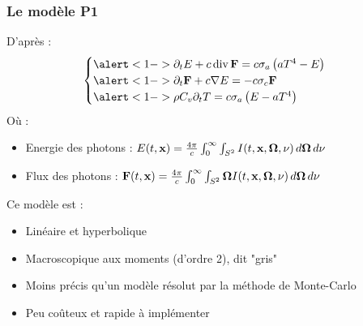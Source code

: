 \begin{frame}
  \frametitle{Le modèle P1}
  \footnotesize
  D'après \parencite{Reference2} :
  \begingroup
  \footnotesize
  \begin{equation*}
      \begin{cases}
        \alert<1->{\partial_tE + c \operatorname {div} \bvec F = c\sigma_a\left(aT^4-E\right)}\\
        \alert<1->{\partial_t\bvec{F} + c \nabla E = -c\sigma_c \bvec{F}} \\
        \alert<1->{\rho C_v \partial_t T = c \sigma_a \left(E-aT^4\right)}
      \end{cases}
  \end{equation*}
  \endgroup
  Où :   %
\begin{itemize}
  \item Energie des photons : $E(t,\textbf{x}) = \frac{4\pi}{c} \int_{0}^{\infty} \int_{S^2} I(t,\textbf{x},\bm{\Omega},\nu) \, d\bm{\Omega} \, d\nu$
  \item Flux des photons :    $\textbf{F}(t,\textbf{x}) = \frac{4\pi}{c} \int_{0}^{\infty} \int_{S^2} \bm{\Omega}I(t,\textbf{x},\bm{\Omega},\nu) \, d\bm{\Omega} \, d\nu$  
\end{itemize}
\pause
Ce modèle est :
\begin{itemize}[<+>]
  \item Linéaire et hyperbolique
  \item Macroscopique aux moments (d’ordre 2), dit "gris"
  \item Moins précis qu'un modèle résolut par la méthode de Monte-Carlo 
  \item Peu coûteux et rapide à implémenter
\end{itemize}

\end{frame}


